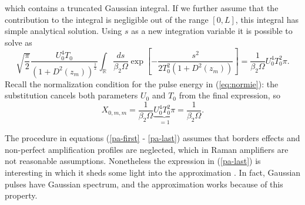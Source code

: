 \documentclass[10pt, lettersize, journal, onecolumn]{IEEEtran}
\begin{document}
which contains a truncated Gaussian integral. If we further assume that the contribution to the integral is negligible out of the range $[0, L]$, this integral has simple analytical solution.
Using $s$ as a new integration variable it is possible to solve as
\begin{equation}
	\sqrt{\dfrac{\pi}{2}}\dfrac{U_0^4 T_0}{(1+D^2(z_m))^{\frac{1}{2}}} \int_{\mathbb{R}} \dfrac{ds}{\beta_2 \Omega} \exp\left[-\dfrac{s^2}{2T_0^2(1+D^2(z_m))} \right] = \dfrac{1}{\beta_2 \Omega} U_0^4 T_0^2 \pi.
\end{equation}
Recall the normalization condition for the pulse energy in (\ref{eq:normie}): the substitution cancels both parameters $U_0$ and $T_0$ from the final expression, so
\begin{equation}\label{pa-last}
	X_{0, m, m} = \dfrac{1}{\beta_2 \Omega} \underbrace{U_0^4 T_0^2 \pi}_{=1} = \dfrac{1}{\beta_2 \Omega}.
\end{equation}

The procedure in equations (\ref{pa-first} - \ref{pa-last}) assumes that borders effects and non-perfect amplification profiles are neglected, which in Raman amplifiers are not reasonable assumptions. Nonetheless the expression in (\ref{pa-last}) is interesting in which it sheds some light into the approximation \cite[eq. 10]{Dar_2013}. In fact, Gaussian pulses have Gaussian spectrum, and the approximation works because of this property.
\end{document}
